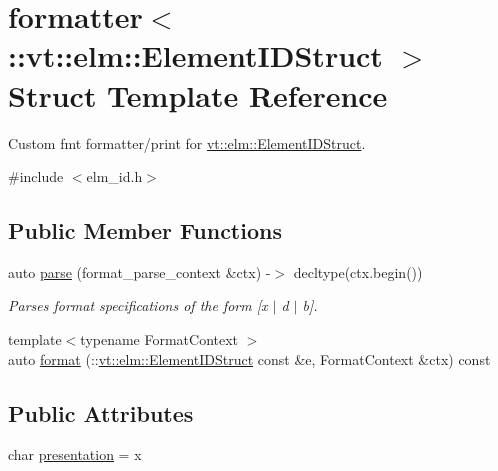 \hypertarget{structformatter_3_1_1vt_1_1elm_1_1_element_i_d_struct_01_4}{}\section{formatter$<$\+:\+:vt\+:\+:elm\+:\+:Element\+I\+D\+Struct $>$ Struct Template Reference}
\label{structformatter_3_1_1vt_1_1elm_1_1_element_i_d_struct_01_4}


Custom fmt formatter/print for {\ttfamily \hyperlink{structvt_1_1elm_1_1_element_i_d_struct}{vt\+::elm\+::\+Element\+I\+D\+Struct}}.  




{\ttfamily \#include $<$elm\+\_\+id.\+h$>$}

\subsection*{Public Member Functions}
\begin{DoxyCompactItemize}
\item 
auto \hyperlink{structformatter_3_1_1vt_1_1elm_1_1_element_i_d_struct_01_4_af609a6eb500b642c471f5687b14432a2}{parse} (format\+\_\+parse\+\_\+context \&ctx) -\/$>$ decltype(ctx.\+begin())
\begin{DoxyCompactList}\small\item\em Parses format specifications of the form \mbox{[}\textquotesingle{}x\textquotesingle{} $\vert$ \textquotesingle{}d\textquotesingle{} $\vert$ \textquotesingle{}b\textquotesingle{}\mbox{]}. \end{DoxyCompactList}\item 
{\footnotesize template$<$typename Format\+Context $>$ }\\auto \hyperlink{structformatter_3_1_1vt_1_1elm_1_1_element_i_d_struct_01_4_af1476f1e35efbd42e918307011d73905}{format} (\+::\hyperlink{structvt_1_1elm_1_1_element_i_d_struct}{vt\+::elm\+::\+Element\+I\+D\+Struct} const \&e, Format\+Context \&ctx) const
\end{DoxyCompactItemize}
\subsection*{Public Attributes}
\begin{DoxyCompactItemize}
\item 
char \hyperlink{structformatter_3_1_1vt_1_1elm_1_1_element_i_d_struct_01_4_a0936af81be586aa4e2c4a141cc9ac59b}{presentation} = \textquotesingle{}x\textquotesingle{}
\end{DoxyCompactItemize}


